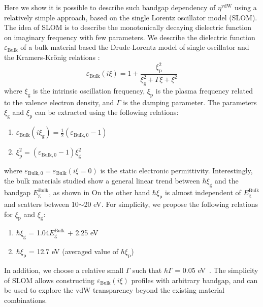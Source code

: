 Here we show it is possible to describe such bandgap dependency of
$\eta^{\mathrm{vdW}}$ using a relatively simple approach, based on the
single Lorentz oscillator model (SLOM).
%
The idea of SLOM is to describe the monotonically decaying dielectric
function on imaginary frequency with few parameters. We describe the
dielectric function $\varepsilon_{\mathrm{Bulk}}$ of a bulk material
based the Drude-Lorentz model of single oscillator and the Kramers-Krönig relations :
\begin{equation}
\label{eq:vdw-lorentz-imag}
\varepsilon_{\mathrm{Bulk}}(i \xi) 
=
1 + \frac{\xi_{\mathrm{p}}^{2}}{\xi_{\mathrm{g}}^{2} + \Gamma \xi + \xi^{2}}
\end{equation}
 where 
\(\xi_{\mathrm{g}}\) is the intrinsic oscillation frequency,
\(\xi_{\mathrm{p}}\) is the plasma frequency related to the valence
electron density, and \(\Gamma\) is the damping parameter.
The parameters \(\xi_{\mathrm{g}}\) and \(\xi_{\mathrm{p}}\) can
be extracted using the following relations:
\begin{enumerate}
\item \(\varepsilon_{\mathrm{Bulk}}(i \xi_{\mathrm{g}}) = \frac{1}{2} (\varepsilon_{\mathrm{Bulk, 0}} - 1)\)
\item \(\xi_{\mathrm{p}}^{2} = (\varepsilon_{\mathrm{Bulk, 0}} - 1) \xi_{\mathrm{g}}^{2}\)
\end{enumerate}
where
$\varepsilon_{\mathrm{Bulk, 0}} = \varepsilon_{\mathrm{Bulk}}(i\xi =
0)$ is the static electronic permittivity.
%
Interestingly, the bulk materials studied show a general linear trend
between \(\hbar \xi_{\mathrm{g}}\) and the bandgap
\(E_{\mathrm{g}}^{\mathrm{Bulk}}\), as shown in   On the other hand \(\hbar \xi_{\mathrm{p}}\) is almost
independent of \(E_{\mathrm{g}}^{\mathrm{Bulk}}\) and scatters between
10\(\sim\)20 eV.  For simplicity, we propose the following relations
for \(\xi_{\mathrm{p}}\) and \(\xi_{\mathrm{g}}\):
\begin{enumerate}
\item \(\hbar \xi_{\mathrm{g}}\) = 1.04\(E_{\mathrm{g}}^{\mathrm{Bulk}}\) + 2.25 eV
\item \(\hbar \xi_{\mathrm{p}}\) = 12.7 eV (averaged value of \(\hbar
   \xi_{\mathrm{p}}\))
 \end{enumerate}
 In addition, we choose a relative small $\Gamma$ such that
 $\hbar \Gamma$ = 0.05 eV~.  The simplicity of SLOM
 allows constructing $\varepsilon_{\mathrm{Bulk}}(i \xi)$ profiles
 with arbitrary bandgap, and can be used to explore the vdW
 transparency beyond the existing material combinations.
 

